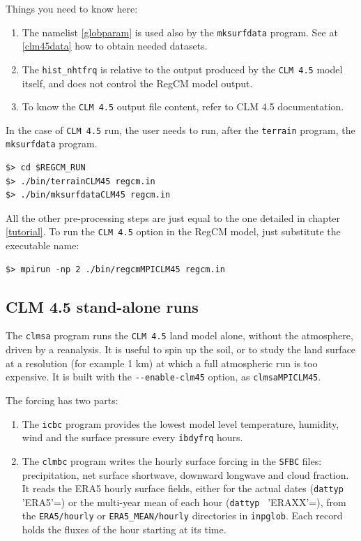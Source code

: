 Things you need to know here:

\begin{enumerate}
\item The namelist \ref{globparam} is used also by the \verb=mksurfdata=
program. See at \ref{clm45data} how to obtain needed datasets.
\item The \verb=hist_nhtfrq= is relative to the output produced by the
\verb=CLM 4.5= model itself, and does not control the RegCM model output.
\item To know the \verb=CLM 4.5= output file content, refer to CLM 4.5
documentation.
\end{enumerate}

In the case of \verb=CLM 4.5= run, the user needs to run, after the
\verb=terrain= program, the \verb=mksurfdata= program.

\begin{Verbatim}
$> cd $REGCM_RUN
$> ./bin/terrainCLM45 regcm.in
$> ./bin/mksurfdataCLM45 regcm.in
\end{Verbatim}

All the other pre-processing steps are just equal to the one detailed in
chapter \ref{tutorial}. To run the \verb=CLM 4.5= option in the RegCM model,
just substitute the executable name:

\begin{Verbatim}
$> mpirun -np 2 ./bin/regcmMPICLM45 regcm.in
\end{Verbatim}

\subsection{CLM 4.5 stand-alone runs}
\label{clmsa}

The \verb=clmsa= program runs the \verb=CLM 4.5= land model alone, without
the atmosphere, driven by a reanalysis. It is useful to spin up the soil, or
to study the land surface at a resolution (for example 1 km) at which a
full atmospheric run is too expensive. It is built with the
\verb=--enable-clm45= option, as \verb=clmsaMPICLM45=.

The forcing has two parts:
\begin{enumerate}
\item The \verb=icbc= program provides the lowest model level temperature,
humidity, wind and the surface pressure every \verb=ibdyfrq= hours.
\item The \verb=clmbc= program writes the hourly surface forcing in the
\verb=SFBC= files: precipitation, net surface shortwave, downward longwave
and cloud fraction. It reads the ERA5 hourly surface fields, either for the
actual dates (\verb=dattyp = 'ERA5'=) or the multi-year mean of each hour
(\verb=dattyp = 'ERAXX'=), from the \verb=ERA5/hourly= or
\verb=ERA5_MEAN/hourly= directories in \verb=inpglob=. Each record holds the
fluxes of the hour starting at its time.
\end{enumerate}

